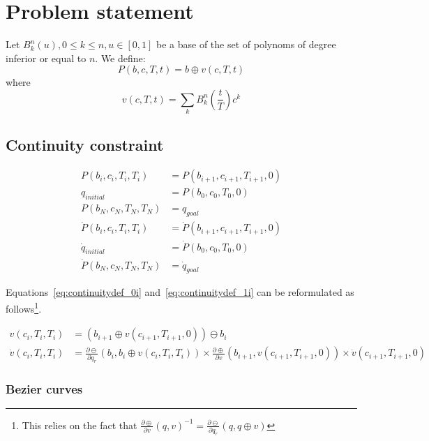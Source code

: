 \documentclass {article}
\newcommand\spline[4]{P(#1, #2, #3, #4)}
\newcommand\splinev[3]{v(#1, #2, #3)}
\newcommand\splinea[2]{\spline{b_{#1}}{c_{#1}}{T_{#1}}{#2}}
\newcommand\splineva[2]{\splinev{c_{#1}}{T_{#1}}{#2}}
\newcommand\dotspline[4]{\dot{P}(#1, #2, #3, #4)}
\newcommand\dotsplinev[3]{\dot{v}(#1, #2, #3)}
\newcommand\dotsplinea[2]{\dotspline{b_{#1}}{c_{#1}}{T_{#1}}{#2}}
\newcommand\dotsplineva[2]{\dotsplinev{c_{#1}}{T_{#1}}{#2}}
\newcommand\Jplusv[2]{\frac{\partial\oplus}{\partial{v}}(#1,#2)}
\newcommand\Jminusr[2]{\frac{\partial\ominus}{\partial{q_r}}(#1,#2)}
\begin{document}
\section{Problem statement}
Let $B^n_k(u), 0 \le k \le n, u \in [0,1]$ be a base of the set of polynoms of degree inferior
or equal to $n$. We define:
\begin{equation}
  \spline{b}{c}{T}{t} = b \oplus \splinev{c}{T}{t}
  \label{eq:splinedef}
\end{equation}
where $$ \splinev{c}{T}{t} = \sum_k B^n_k(\frac{t}{T}) c^k $$

\subsection{Continuity constraint}

\begin{align}
  \splinea{i}{T_i} &= \splinea{i+1}{0} \label{eq:continuitydef_0i}\\
  q_{initial}      &= \splinea{  0}{0} \label{eq:continuitydef_00} \\
  \splinea{N}{T_N} &= q_{goal}         \label{eq:continuitydef_0N} \\
%
  \dotsplinea{i}{T_i} &= \dotsplinea{i+1}{0} \label{eq:continuitydef_1i} \\
  \dot{q}_{initial}   &= \dotsplinea{  0}{0} \label{eq:continuitydef_10} \\
  \dotsplinea{N}{T_N} &= \dot{q}_{goal}      \label{eq:continuitydef_1N}
\end{align}

Equations~\eqref{eq:continuitydef_0i} and~\eqref{eq:continuitydef_1i} can be reformulated
as follows\footnote{This relies on the fact that $\Jplusv{q}{v}^{-1} = \Jminusr{q}{q\oplus v}$}.

\begin{align*}
  \splineva{i}{T_i} &= (b_{i+1} \oplus \splineva{i+1}{0}) \ominus b_i \\
  \dotsplineva{i}{T_i} &=
  \Jminusr{b_i}{b_i\oplus\splineva{i}{T_i}} \times
  \Jplusv{b_{i+1}}{\splineva{i+1}{0}} \times
  \dotsplineva{i+1}{0}
\end{align*}

\subsubsection{Bezier curves}
\end{document}
